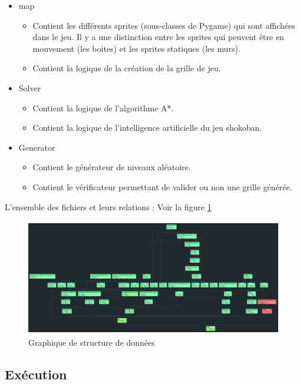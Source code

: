 \documentclass[a4paper,12pt]{article}
\begin{document}
\begin{itemize}
  \item{map}
    \begin{itemize}
      \item{Contient les différents sprites (sous-classes de Pygame) qui sont affichées dans le jeu. Il y a une distinction entre les sprites qui peuvent être en mouvement (les boites) et les sprites statiques (les murs).}
      \item{Contient la logique de la création de la grille de jeu.}
    \end{itemize}
  \item{Solver}
    \begin{itemize}
      \item{Contient la logique de l'algorithme A*.}
      \item{Contient la logique de l'intelligence artificielle du jeu shokoban.}
    \end{itemize}
	\item{Generator}
    \begin{itemize}
      \item{Contient le générateur de niveaux aléatoire.}
      \item{Contient le vérificateur permettant de valider ou non une grille générée.}
    \end{itemize}
\end{itemize}

L'ensemble des fichiers et leurs relations : Voir la figure \ref{fig::graph}
\begin{figure}[H]
 \centering
 \includegraphics[width=\linewidth, height=2in]{Illustrations/graphJetBrains.png}
\caption{Graphique de structure de données}
\label{fig::graph}
\end{figure}

\subsection{Exécution}
\end{document}
